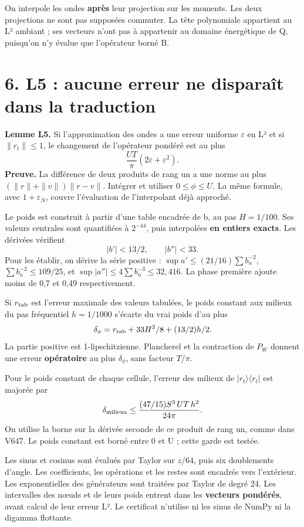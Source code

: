 \documentclass[
  10pt,
  a4paper,
]{article}
\begin{document}
On interpole les ondes \textbf{après} leur projection sur les moments.
Les deux projections ne sont pas supposées commuter. La tête polynomiale
appartient au L² ambiant ; ses vecteurs n'ont pas à appartenir au
domaine énergétique de Q, puisqu'on n'y évalue que l'opérateur borné B.

\hypertarget{l5-aucune-erreur-ne-disparauxeet-dans-la-traduction}{%
\section{6. L5 : aucune erreur ne disparaît dans la
traduction}\label{l5-aucune-erreur-ne-disparauxeet-dans-la-traduction}}

\textbf{Lemme L5.} Si l'approximation des ondes a une erreur uniforme
\(\varepsilon\) en L² et si \(\|r_t\|\le1\), le changement de
l'opérateur pondéré est au plus \[
\frac{UT}{\pi}(2\varepsilon+\varepsilon^2).
\] \textbf{Preuve.} La différence de deux produits de rang un a une
norme au plus \((\|r\|+\|v\|)\|r-v\|\). Intégrer et utiliser
\(0\le\phi\le U\). La même formule, avec \(1+\varepsilon_N\), couvre
l'évaluation de l'interpolant déjà approché.

Le poids est construit à partir d'une table encadrée de b, au pas
\(H=1/100\). Ses valeurs centrales sont quantifiées à \(2^{-44}\), puis
interpolées \textbf{en entiers exacts}. Les dérivées vérifient \[
|b'|<13/2,\qquad |b''|<33.
\] Pour les établir, on dérive la série positive :
\(\sup a'\le(21/16)\sum b_n^{-2}\), \(\sum b_n^{-2}\le109/25\), et
\(\sup|a''|\le4\sum b_n^{-3}\le32{,}416\). La phase première ajoute
moins de 0,7 et 0,49 respectivement.

Si \(r_{\rm tab}\) est l'erreur maximale des valeurs tabulées, le poids
constant aux milieux du pas fréquentiel \(h=1/1000\) s'écarte du vrai
poids d'au plus \[
\delta_\phi=r_{\rm tab}+33H^2/8+(13/2)h/2.
\] La partie positive est 1-lipschitzienne. Plancherel et la contraction
de \(P_W\) donnent une erreur \textbf{opératoire} au plus
\(\delta_\phi\), sans facteur \(T/\pi\).

Pour le poids constant de chaque cellule, l'erreur des milieux de
\(|r_t\rangle\langle r_t|\) est majorée par \[
\delta_{\rm milieux}\le
\frac{(47/15)S^3\,UT\,h^2}{24\pi}.
\] On utilise la borne sur la dérivée seconde de ce produit de rang un,
comme dans V647. Le poids constant est borné entre 0 et U ; cette garde
est testée.

Les sinus et cosinus sont évalués par Taylor sur \(z/64\), puis six
doublements d'angle. Les coefficients, les opérations et les restes sont
encadrés vers l'extérieur. Les exponentielles des générateurs sont
traitées par Taylor de degré 24. Les intervalles des nœuds et de leurs
poids entrent dans les \textbf{vecteurs pondérés}, avant calcul de leur
erreur L². Le certificat n'utilise ni les sinus de NumPy ni la digamma
flottante.
\end{document}
